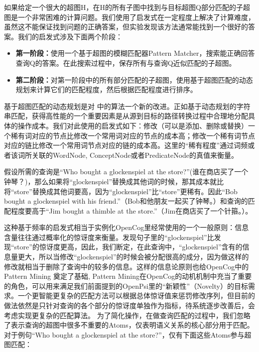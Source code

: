 如果给定一个很大的超图H，在H的所有子图中找到与目标超图Q部分匹配的子超图是一个非常困难的计算问题。我们使用了启发式在一定程度上解决了计算难度，虽然这不能保证找到问题的正确答案，但实验发现该方法通常能找到一个很好的答案。我们的启发式涉及下面两个阶段：

\begin{itemize}
\item {\bf 第一阶段：}使用一个基于超图的模糊匹配器Pattern Matcher，搜索能正确回答查询Q的答案。在此搜索过程中，保存所有与查询Q近似匹配的子超图。
\item {\bf 第二阶段：}对第一阶段中的所有部分匹配的子超图，使用基于超图匹配的动态规划来计算它们的匹配程度，然后根据匹配程度进行排序。
\end{itemize}
基于超图匹配的动态规划是对 \cite{Zass2008}中的算法一个新的改进。正如基于动态规划的字符串匹配，获得高性能的一个重要因素是从源到目标的路径转换过程中合理地分配具体的操作成本。我们对此使用的启发式如下：修改（可以是添加、删除或替换）一个稀有词对应的节点比修改一个常用词对应的节点的成本高；修改一个稀有词节点对应的链比修改一个常用词节点对应的链的成本高。这里的“稀有程度”通过词频或者该词所关联的WordNode, ConceptNode或者PredicateNode的真值来衡量。

假设所需的查询是“Who bought a glockenspiel at the store?”(谁在商店买了一个钟琴？)，那么如果将“glockenspiel”替换成其他词的时候，那其成本就比将“store”替换成其他词要高，因为“glockenspiel”比“store”更稀有。因此“Bob bought a glockenspiel with his friend.”（Bob和他朋友一起买了钟琴。）和查询的匹配程度要高于“Jim bought a thimble at the store.”（Jim在商店买了一个针箍。）。

这种基于频率的启发式相当于实例化OpenCog里经常使用的一个一般原则：信息含量往往通过概率化的惊讶度来衡量。发现句子里的“glockenspiel”比发现“store”的惊讶度更高，因此，我们断定，在此查询中，“glockenspiel”含有的信息量更大，所以当修改“glockenspiel”的时候会被分配很高的成分，因为做这样的修改就相当于删除了查询中的较多的信息。这样的信息论原则也给OpenCog中的Pattern Mining\cite{ONeill2012} 奠定了基础, Pattern Mining在OpenCog的动机机制中充当了重要的角色，可以用来满足我们前面提到的OpenPsi里的“新颖性”（Novelty）的目标需求。一个更智能更复杂的匹配方法可以根据总体惊讶值来惩罚修改序列，但目前的做法依然是只针对查询的各个部分的惊讶度单独作为指标，待系统逐步改善后，会考虑实现更复杂的匹配算法。
为了简化操作，在做查询匹配的过程中，我们忽略了表示查询的超图中很多不重要的Atoms，仅表明语义关系的核心部分用于匹配。对于例句“Who bought a glockenspiel at the store?”，仅有下面这些Atoms参与超图匹配：

